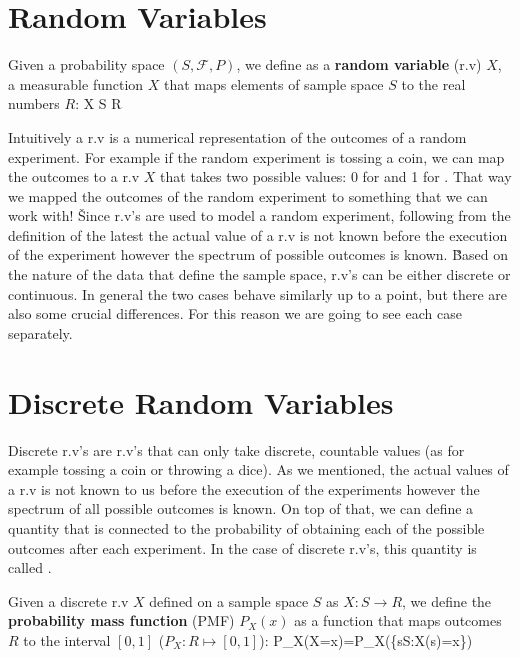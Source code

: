 \section{Random Variables}

Given a probability space $(S, \mathcal{F}, P)$, we define as a \textbf{random variable} (r.v) $X$, a measurable
function $X$ that maps elements of sample space $S$ to the real numbers $R$:
\bse
X \colon S \to R
\ese
\ed

Intuitively a r.v is a numerical representation of the outcomes of a random experiment. For example if the random
experiment is tossing a coin, we can map the outcomes to a r.v $X$ that takes two possible values: 0 for 
and 1 for . That way we mapped the outcomes of the random experiment to something that we can work with! \v

Since r.v's are used to model a random experiment, following from the definition of the latest the actual value of a
r.v is not known before the execution of the experiment however the spectrum of possible outcomes is known. \v

Based on the nature of the data that define the sample space, r.v's can be either discrete or continuous. In general
the two cases behave similarly up to a point, but there are also some crucial differences. For this reason we are
going to see each case separately.

\section{Discrete Random Variables}

Discrete r.v's are r.v's that can only take discrete, countable values (as for example tossing a coin or throwing a
dice). As we mentioned, the actual values of a r.v is not known to us before the execution of the experiments however
the spectrum of all possible outcomes is known. On top of that, we can define a quantity that is connected to the
probability of obtaining each of the possible outcomes after each experiment. In the case of discrete r.v's, this
quantity is called .

Given a discrete r.v $X$ defined on a sample space $S$ as $X \colon S \to R$, we define the \textbf{probability mass
function} (PMF) $P_{X}(x)$ as a function that maps outcomes $R$ to the interval $[0,1]$ ($P_{X}:R\mapsto [0,1]$):
\bse
P_{X}(X=x)=P_{X}(\{s\in S:X(s)=x\})
\ese

